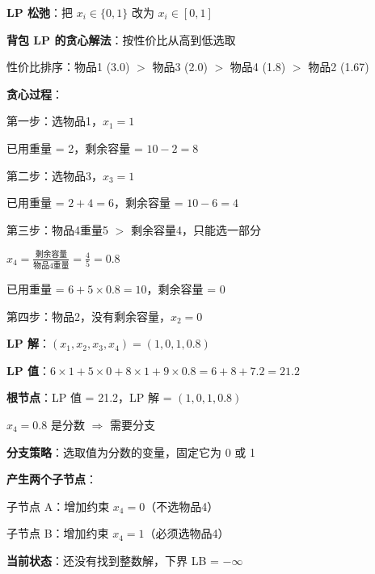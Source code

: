 \documentclass[12pt, a4paper]{ctexart}
\begin{document}
\begin{blackboard}

\textbf{LP 松弛}：把 $x_i \in \{0, 1\}$ 改为 $x_i \in [0, 1]$

\textbf{背包 LP 的贪心解法}：按性价比从高到低选取

性价比排序：物品1 (3.0) $>$ 物品3 (2.0) $>$ 物品4 (1.8) $>$ 物品2 (1.67)

\textbf{贪心过程}：

第一步：选物品1，$x_1 = 1$

已用重量 = 2，剩余容量 = $10 - 2 = 8$

第二步：选物品3，$x_3 = 1$

已用重量 = $2 + 4 = 6$，剩余容量 = $10 - 6 = 4$

第三步：物品4重量5 $>$ 剩余容量4，只能选一部分

$x_4 = \frac{\text{剩余容量}}{\text{物品4重量}} = \frac{4}{5} = 0.8$

已用重量 = $6 + 5 \times 0.8 = 10$，剩余容量 = 0

第四步：物品2，没有剩余容量，$x_2 = 0$

\textbf{LP 解}：$(x_1, x_2, x_3, x_4) = (1, 0, 1, 0.8)$

\textbf{LP 值}：$6 \times 1 + 5 \times 0 + 8 \times 1 + 9 \times 0.8 = 6 + 8 + 7.2 = \mathbf{21.2}$

\end{blackboard}

\begin{blackboard}[第二步：分支]

\textbf{根节点}：LP 值 = 21.2，LP 解 = $(1, 0, 1, 0.8)$

$x_4 = 0.8$ 是分数 $\Rightarrow$ 需要分支

\textbf{分支策略}：选取值为分数的变量，固定它为 0 或 1

\textbf{产生两个子节点}：

子节点 A：增加约束 $x_4 = 0$（不选物品4）

子节点 B：增加约束 $x_4 = 1$（必须选物品4）

\begin{center}
\end{center}

\textbf{当前状态}：还没有找到整数解，下界 LB = $-\infty$

\end{blackboard}
\end{document}
